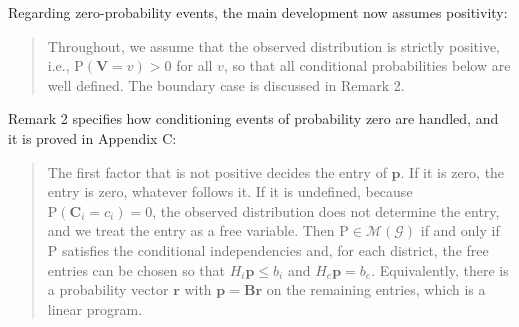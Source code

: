 \documentclass{article}
\def\Pr{{\mathrm{P}}}
\newcommand{\bV}{\boldsymbol{V}}
\begin{document}
\begin{enumerate}
\begin{mdframed}
Regarding zero-probability events, the main development now assumes positivity:
        \begin{quote}
        Throughout, we assume that the observed distribution is strictly positive, i.e., $\Pr(\bV = v) > 0$ for all $v$, so that all conditional probabilities below are well defined. The boundary case is discussed in Remark 2.
        \end{quote}
        Remark 2 specifies how conditioning events of probability zero are handled, and it is proved in Appendix C:
        \begin{quote}
        The first factor that is not positive decides the entry of $\boldsymbol{p}$. If it is zero, the entry is zero, whatever follows it. If it is undefined, because $\Pr(\boldsymbol{C}_i = c_i) = 0$, the observed distribution does not determine the entry, and we treat the entry as a free variable. Then $\Pr \in \mathcal{M}(\mathcal{G})$ if and only if $\Pr$ satisfies the conditional independencies and, for each district, the free entries can be chosen so that $H_i \boldsymbol{p} \leq b_i$ and $H_e \boldsymbol{p} = b_e$. Equivalently, there is a probability vector $\boldsymbol{r}$ with $\boldsymbol{p} = \boldsymbol{B}\boldsymbol{r}$ on the remaining entries, which is a linear program.
        \end{quote}
    \end{mdframed}


\end{enumerate}
\end{document}
